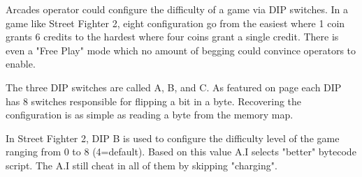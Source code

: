 \begin{trivia}
Arcades operator could configure the difficulty of a game via DIP switches. In a game like Street Fighter 2, eight configuration go from the easiest where 1 coin grants 6 credits to the hardest where four coins grant a single credit. There is even a "Free Play" mode which no amount of begging could convince operators to enable\cite{sf2manual}.
\end{trivia}

The three DIP switches are called A, B, and C. As featured on page \pageref{fig:boarda} each DIP has 8 switches responsible for flipping a bit in a byte. Recovering the configuration is as simple as reading a byte from the memory map.

\begin{trivia}
In Street Fighter 2, DIP B is used to configure the difficulty level of the game ranging from 0 to 8 (4=default). Based on this value A.I selects "better" bytecode\cite{sf2aiengine} script. The A.I still cheat in all of them by skipping "charging"\cite{sf2aiengine}.
\end{trivia}




